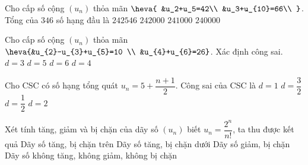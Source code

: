 \begin{ex}%
Cho cấp số cộng $\left(u_n\right)$ thỏa mãn $\heva{
&u_2+u_5=42\\
&u_3+u_{10}=66\\
}$. Tổng của $346$ số hạng đầu là
\choice
{\True $242546$}
{$242000$}
{$241000$}
{$240000$}
\end{ex}

\begin{ex}%
Cho cấp số cộng $\left(u_{n}\right)$ thỏa mãn $\heva{&u_{2}-u_{3}+u_{5}=10 \\ &u_{4}+u_{6}=26}$. Xác định công sai.
\choice
{\True$d=3$}
{$d=5$}
{$d=6$}
{$d=4$}
\end{ex}

\begin{ex}%
Cho CSC có số hạng tổng quát $u_n=5+\dfrac{n+1}{2}$. Công sai của CSC là
\choice
{$d=1$}
{$d=\dfrac{3}{2}$}
{\True $d=\dfrac{1}{2}$}
{$d=2$}
\end{ex}

\begin{ex}%
Xét tính tăng, giảm và bị chặn của dãy số $ (u_n) $ biết $ u_n=\dfrac{2^n}{n!} $, ta thu được kết quả
\choice
{Dãy số tăng, bị chặn trên}
{Dãy số tăng, bị chặn dưới}
{\True Dãy số giảm, bị chặn}
{Dãy số không tăng, không giảm, không bị chặn}
\end{ex}

